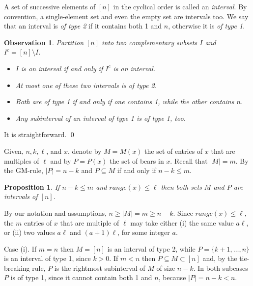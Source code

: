 \documentclass[10pt]{article}
\newtheorem{proposition}{Proposition}
\newtheorem{observation}{Observation}
\theoremstyle{definition}
\begin{document}
A set of successive elements of $[n]$ 
in the cyclical order is called an {\em interval}. 
By convention, a single-element set  
and even the empty set are intervals too. 
We say that an interval is {\em of type 2}  
if it contains both  1 and $n$, 
otherwise it is {\em of type 1}.

\begin{observation}
Partition $[n]$ into two complementary subsets  
$I$  and $I^c = [n] \setminus I$. 
\begin{itemize}
\item[(j)] 
$I$ is an interval 
if and only if $I^c$ is an interval.
\item[(jj)] At most one of these two intervals is of type 2.
\item[(jjj)] Both are of type 1 if and only if 
one contains 1, while the other contains  $n$.
\item[(jv)] Any subinterval of an interval of type 1 
is of type 1, too. 
\end{itemize}
\end{observation}

\proof It is straightforward. 
\qed 

\medskip 

Given, $n,k,\ell$, and $x$, 
denote by $M = M(x)$ the set of entries of 
$x$ that are multiples of $\ell$ and 
by $P = P(x)$ the set of bears in $x$. 
Recall that $|M| = m$.  
By the GM-rule, $|P| = n-k$  and     
$P \subseteq M$  if and only if  $n-k \leq m$.

\begin{proposition}
\label{p3}
If $n-k \leq m$ and $range(x) \leq \ell$ 
then both sets $M$ and $P$ are intervals of $[n]$. 
\end{proposition}

\proof 
By our notation and assumptions, 
$n \geq |M| = m \geq n-k$. 
Since $range(x) \leq \ell$, 
the $m$ entries of $x$ that are multiple of $\ell$    
may take either (i) the same value $a \ell$,    
or (ii) two values $a \ell$  and  $(a+1) \ell$, 
for some integer  $a$. 

Case (i). If  $m=n$  then $M = [n]$   
is an interval of type 2, 
while  $P = \{k+1, \ldots, n\}$  
is an interval of type 1, since $k > 0$.  
If $m < n$  then $P \subseteq M \subset [n]$ 
and, by the tie-breaking rule, $P$  is the rightmost 
subinterval of $M$  of size $n-k$. 
In both subcases $P$  is of type 1,  
since it cannot contain both 1 and $n$, 
because $|P| = n-k < n$. %
\end{document}
